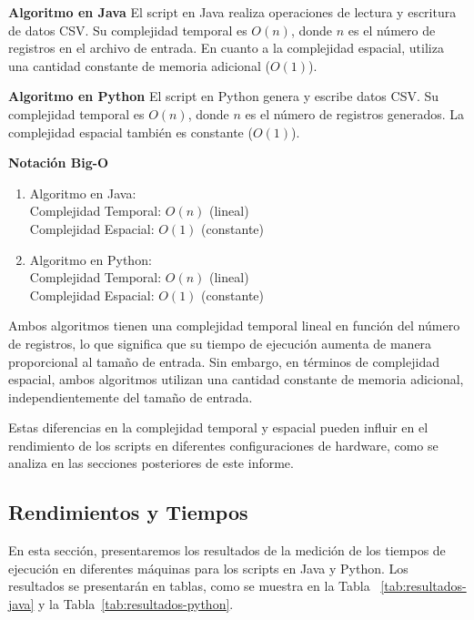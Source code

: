 \documentclass[conference]{IEEEtran}
\begin{document}
\textbf{Algoritmo en Java}
El script en Java realiza operaciones de lectura y escritura de datos CSV. Su complejidad temporal es \(O(n)\), donde \(n\) es el número de registros en el archivo de entrada. En cuanto a la complejidad espacial, utiliza una cantidad constante de memoria adicional (\(O(1)\)).

\textbf{Algoritmo en Python}
El script en Python genera y escribe datos CSV. Su complejidad temporal es \(O(n)\), donde \(n\) es el número de registros generados. La complejidad espacial también es constante (\(O(1)\)).

\textbf{Notación Big-O}

\begin{enumerate}
\item Algoritmo en Java:
\\ Complejidad Temporal: \(O(n)\) (lineal)
\\ Complejidad Espacial: \(O(1)\) (constante)

\item Algoritmo en Python:
\\ Complejidad Temporal: \(O(n)\) (lineal)
\\ Complejidad Espacial: \(O(1)\) (constante)
\\
\end{enumerate}

Ambos algoritmos tienen una complejidad temporal lineal en función del número de registros, lo que significa que su tiempo de ejecución aumenta de manera proporcional al tamaño de entrada. Sin embargo, en términos de complejidad espacial, ambos algoritmos utilizan una cantidad constante de memoria adicional, independientemente del tamaño de entrada.

Estas diferencias en la complejidad temporal y espacial pueden influir en el rendimiento de los scripts en diferentes configuraciones de hardware, como se analiza en las secciones posteriores de este informe.

\subsection{Rendimientos y Tiempos}

En esta sección, presentaremos los resultados de la medición de los tiempos de ejecución en diferentes máquinas para los scripts en Java y Python. Los resultados se presentarán en tablas, como se muestra en la Tabla ~\ref{tab:resultados-java} y la Tabla~\ref{tab:resultados-python}.
\end{document}
